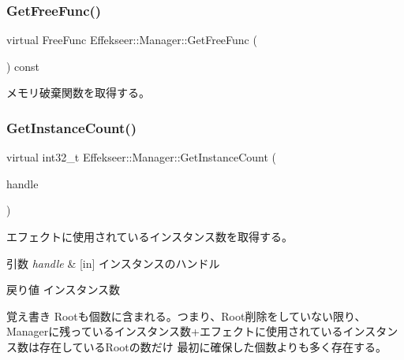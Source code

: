 \subsubsection{\texorpdfstring{Get\+Free\+Func()}{GetFreeFunc()}}
{\footnotesize\ttfamily virtual Free\+Func Effekseer\+::\+Manager\+::\+Get\+Free\+Func (\begin{DoxyParamCaption}{ }\end{DoxyParamCaption}) const\hspace{0.3cm}{\ttfamily [pure virtual]}}



メモリ破棄関数を取得する。 

\mbox{\label{class_effekseer_1_1_manager_a4e4831b6514c683cd9cabf5cfe1103ab}} 
\subsubsection{\texorpdfstring{Get\+Instance\+Count()}{GetInstanceCount()}}
{\footnotesize\ttfamily virtual int32\+\_\+t Effekseer\+::\+Manager\+::\+Get\+Instance\+Count (\begin{DoxyParamCaption}\item[{\mbox{\hyperlink{namespace_effekseer_afba58b8d812da862190e9bbfc040824a}{Handle}}}]{handle }\end{DoxyParamCaption})\hspace{0.3cm}{\ttfamily [pure virtual]}}



エフェクトに使用されているインスタンス数を取得する。 


\begin{DoxyParams}{引数}
{\em handle} & \mbox{[}in\mbox{]} インスタンスのハンドル \\
\hline
\end{DoxyParams}
\begin{DoxyReturn}{戻り値}
インスタンス数 
\end{DoxyReturn}
\begin{DoxyNote}{覚え書き}
Rootも個数に含まれる。つまり、\+Root削除をしていない限り、 Managerに残っているインスタンス数+エフェクトに使用されているインスタンス数は存在している\+Rootの数だけ 最初に確保した個数よりも多く存在する。 
\end{DoxyNote}
\mbox{\label{class_effekseer_1_1_manager_adef5e990faa38e39b9aa57f03f485747}} 

